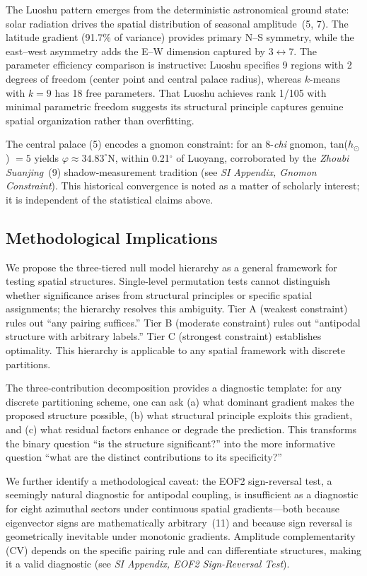 \documentclass[9pt,twocolumn]{article}
\begin{document}
The Luoshu pattern emerges from the deterministic astronomical ground state: solar radiation drives the spatial distribution of seasonal amplitude~(5, 7). The latitude gradient (91.7\% of variance) provides primary N--S symmetry, while the east--west asymmetry adds the E--W dimension captured by 3$\leftrightarrow$7. The parameter efficiency comparison is instructive: Luoshu specifies 9 regions with 2 degrees of freedom (center point and central palace radius), whereas $k$-means with $k = 9$ has 18 free parameters. That Luoshu achieves rank 1/105 with minimal parametric freedom suggests its structural principle captures genuine spatial organization rather than overfitting.

The central palace (5) encodes a gnomon constraint: for an 8-\textit{chi} gnomon, tan($h_\odot$) $= 5$ yields $\varphi \approx 34.83^\circ$N, within 0.21$^\circ$ of Luoyang, corroborated by the \textit{Zhoubi Suanjing}~(9) shadow-measurement tradition (see \textit{SI Appendix, Gnomon Constraint}). This historical convergence is noted as a matter of scholarly interest; it is independent of the statistical claims above.

\subsection*{Methodological Implications}

We propose the three-tiered null model hierarchy as a general framework for testing spatial structures. Single-level permutation tests cannot distinguish whether significance arises from structural principles or specific spatial assignments; the hierarchy resolves this ambiguity. Tier A (weakest constraint) rules out ``any pairing suffices.'' Tier B (moderate constraint) rules out ``antipodal structure with arbitrary labels.'' Tier C (strongest constraint) establishes optimality. This hierarchy is applicable to any spatial framework with discrete partitions.

The three-contribution decomposition provides a diagnostic template: for any discrete partitioning scheme, one can ask (a) what dominant gradient makes the proposed structure possible, (b) what structural principle exploits this gradient, and (c) what residual factors enhance or degrade the prediction. This transforms the binary question ``is the structure significant?'' into the more informative question ``what are the distinct contributions to its specificity?''

We further identify a methodological caveat: the EOF2 sign-reversal test, a seemingly natural diagnostic for antipodal coupling, is insufficient as a diagnostic for eight azimuthal sectors under continuous spatial gradients---both because eigenvector signs are mathematically arbitrary~(11) and because sign reversal is geometrically inevitable under monotonic gradients. Amplitude complementarity (CV) depends on the specific pairing rule and can differentiate structures, making it a valid diagnostic (see \textit{SI Appendix, EOF2 Sign-Reversal Test}).
\end{document}
